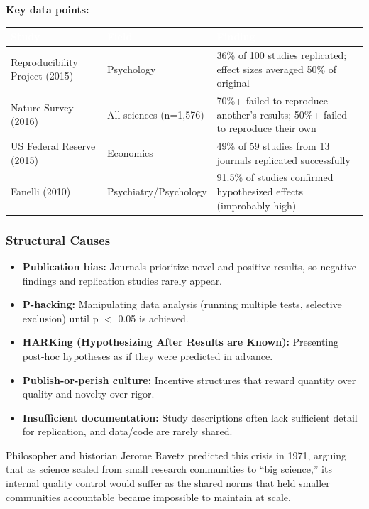 \documentclass[11pt,letterpaper]{article}
\newcommand{\tableheader}[1]{\textbf{\sffamily\textcolor{white}{#1}}}
\begin{document}
\textbf{Key data points:}
\begin{center}
\begin{tabularx}{\textwidth}{L{4cm}L{4cm}X}
\toprule
{}
\tableheader{Study} & \tableheader{Field} & \tableheader{Finding} \\
\midrule
Reproducibility Project (2015) & Psychology & 36\% of 100 studies replicated; effect sizes averaged 50\% of original \\
Nature Survey (2016) & All sciences (n=1,576) & 70\%+ failed to reproduce another's results; 50\%+ failed to reproduce their own \\
US Federal Reserve (2015) & Economics & 49\% of 59 studies from 13 journals replicated successfully \\
Fanelli (2010) & Psychiatry/Psychology & 91.5\% of studies confirmed hypothesized effects (improbably high) \\
\bottomrule
\end{tabularx}
\end{center}

\subsubsection{Structural Causes}

\begin{itemize}[leftmargin=1.5em]
  \item \textbf{Publication bias:} Journals prioritize novel and positive results, so negative findings and replication studies rarely appear.
  \item \textbf{P-hacking:} Manipulating data analysis (running multiple tests, selective exclusion) until p $<$ 0.05 is achieved.
  \item \textbf{HARKing (Hypothesizing After Results are Known):} Presenting post-hoc hypotheses as if they were predicted in advance.
  \item \textbf{Publish-or-perish culture:} Incentive structures that reward quantity over quality and novelty over rigor.
  \item \textbf{Insufficient documentation:} Study descriptions often lack sufficient detail for replication, and data/code are rarely shared.
\end{itemize}

Philosopher and historian Jerome Ravetz predicted this crisis in 1971, arguing that as science scaled from small research communities to ``big science,'' its internal quality control would suffer as the shared norms that held smaller communities accountable became impossible to maintain at scale.
\end{document}
